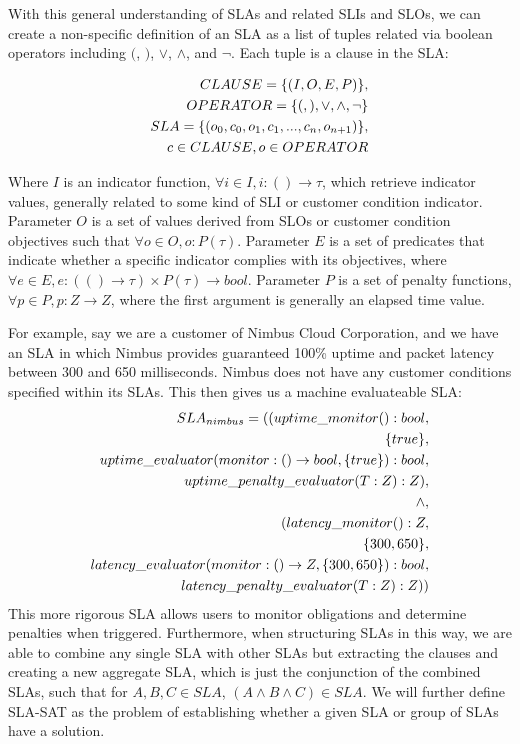 With this general understanding of SLAs and related SLIs and SLOs, we can create a non-specific definition of an SLA as a list of tuples related via boolean operators including $($, $)$, $\lor$, $\land$, and $\lnot$.  Each tuple is a clause in the SLA:

\begin{eqnarray}
CLAUSE = \lbrace (I,O,E,P) \rbrace, \\
OPERATOR = \lbrace ( , ) , \lor, \land, \lnot \rbrace \\
SLA = \lbrace ( o_{0}, c_{0}, o_{1}, c_{1}, ..., c_{n}, o_{n + 1} ) \rbrace , \\ c \in CLAUSE, o \in OPERATOR \notag
\end{eqnarray}

Where $ I $ is an indicator function, $ \forall i \in I, i : () \rightarrow \tau $, which retrieve indicator values, generally related to some kind of SLI or customer condition indicator.  Parameter $ O $ is a set of values derived from SLOs or customer condition objectives such that $ \forall o \in O, o : P(\tau) $.  Parameter $ E $ is a set of predicates that indicate whether a specific indicator complies with its objectives, where $ \forall e \in E, e : ( () \rightarrow \tau ) \times P(\tau) \rightarrow bool $.  Parameter $ P $ is a set of penalty functions, $ \forall p \in P, p : Z \rightarrow Z $, where the first argument is generally an elapsed time value.

For example, say we are a customer of Nimbus Cloud Corporation, and we have an SLA in which Nimbus provides guaranteed 100\% uptime and packet latency between 300 and 650 milliseconds.  Nimbus does not have any customer conditions specified within its SLAs.  This then gives us a machine evaluateable SLA:
\begin{align}
SLA_{nimbus} = ( ( uptime\_monitor() : bool, \notag\\
\lbrace true \rbrace, \notag \\
uptime\_evaluator( monitor : () \rightarrow bool, \lbrace true \rbrace) : bool, \notag \\
uptime\_penalty\_evaluator( T : Z ) : Z ), \notag \\
\land, \notag \\
( latency\_monitor() : Z, \notag \\
\lbrace 300, 650 \rbrace, \notag \\
latency\_evaluator( monitor : () \rightarrow Z, \lbrace 300, 650 \rbrace) : bool, \notag \\
latency\_penalty\_evaluator( T : Z ) : Z) ) \notag
\end{align}
This more rigorous SLA allows users to monitor obligations and determine penalties when triggered.  Furthermore, when structuring SLAs in this way, we are able to combine any single SLA with other SLAs but extracting the clauses and creating a new aggregate SLA, which is just the conjunction of the combined SLAs, such that for $ A, B, C \in SLA $, $ ( A \land B \land C ) \in SLA $.  We will further define SLA-SAT as the problem of establishing whether a given SLA or group of SLAs have a solution.

